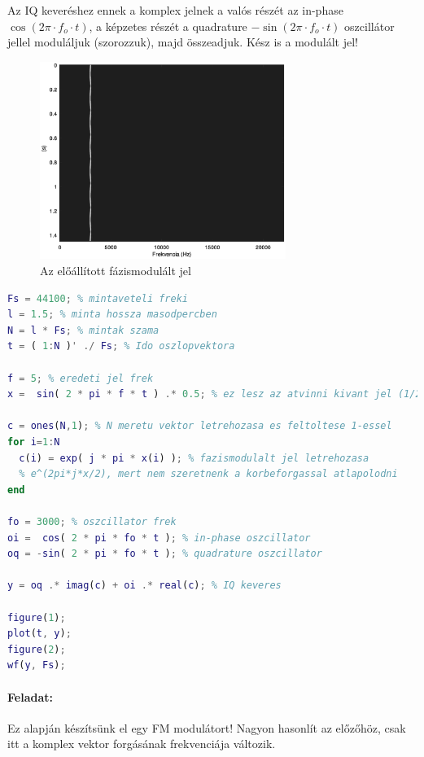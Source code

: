 \documentclass[12pt,a4paper]{article}
\begin{document}
Az IQ keveréshez ennek a komplex jelnek a valós részét az in-phase $\cos(2\pi \cdot f_o \cdot t)$, a képzetes részét a quadrature $-\sin(2\pi \cdot f_o \cdot t)$ oszcillátor jellel moduláljuk (szorozzuk), majd összeadjuk. Kész is a modulált jel!

\begin{figure}[H]
\begin{center}
\includegraphics[width=8cm]{figures/modulaciok_workshop_phase.eps}
\caption{Az előállított fázismodulált jel}
\label{fig:phase}
\end{center}
\end{figure}
\clearpage
\begin{lstlisting}[frame=single,language=matlab,caption=Fázismoduláció IQ modulátorral]
Fs = 44100; % mintaveteli freki
l = 1.5; % minta hossza masodpercben
N = l * Fs; % mintak szama
t = ( 1:N )' ./ Fs; % Ido oszlopvektora

f = 5; % eredeti jel frek
x =  sin( 2 * pi * f * t ) .* 0.5; % ez lesz az atvinni kivant jel (1/2 amplitudo)

c = ones(N,1); % N meretu vektor letrehozasa es feltoltese 1-essel
for i=1:N
  c(i) = exp( j * pi * x(i) ); % fazismodulalt jel letrehozasa
  % e^(2pi*j*x/2), mert nem szeretnenk a korbeforgassal atlapolodni
end

fo = 3000; % oszcillator frek
oi =  cos( 2 * pi * fo * t ); % in-phase oszcillator
oq = -sin( 2 * pi * fo * t ); % quadrature oszcillator

y = oq .* imag(c) + oi .* real(c); % IQ keveres

figure(1);
plot(t, y);
figure(2);
wf(y, Fs);
\end{lstlisting}

\paragraph{Feladat:} Ez alapján készítsünk el egy FM modulátort! Nagyon hasonlít az előzőhöz, csak itt a komplex vektor forgásának frekvenciája változik.
\end{document}
